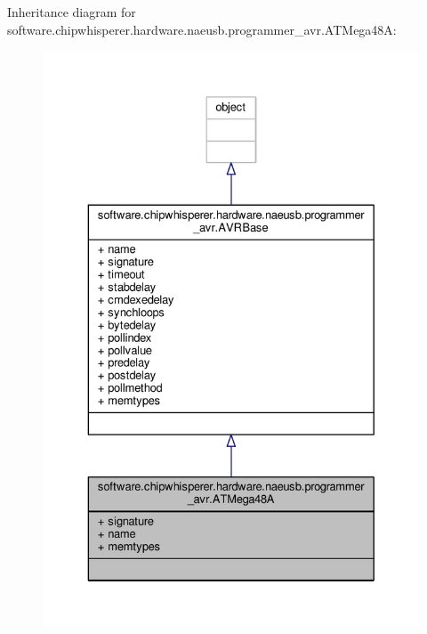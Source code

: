 Inheritance diagram for software.\+chipwhisperer.\+hardware.\+naeusb.\+programmer\+\_\+avr.\+A\+T\+Mega48\+A\+:\nopagebreak
\begin{figure}[H]
\begin{center}
\leavevmode
\includegraphics[width=329pt]{db/d0f/classsoftware_1_1chipwhisperer_1_1hardware_1_1naeusb_1_1programmer__avr_1_1ATMega48A__inherit__graph}
\end{center}
\end{figure}


